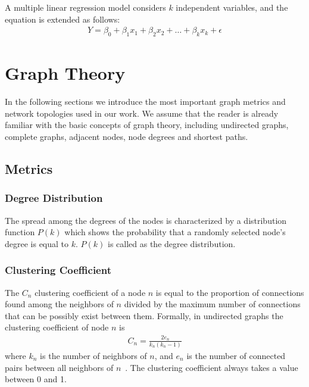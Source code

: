 A multiple linear regression model considers $k$ independent variables, and the equation is extended as follows:
\begin{align}
	Y = \beta_0 + \beta_1x_1 + \beta_2x_2 + \dots + \beta_kx_k + \epsilon
\end{align}

\section{Graph Theory}

In the following sections we introduce the most important graph metrics and network topologies used in our work. We assume that the reader is already familiar with the basic concepts of graph theory, including undirected graphs, complete graphs, adjacent nodes,
node degrees and shortest paths.
\subsection{Metrics}

\subsubsection{Degree Distribution}

The spread among the degrees of the nodes is characterized by a distribution function $P(k)$ which shows the probability that a randomly selected node's degree is equal to $k$. $P(k)$ is called as the degree distribution.

\subsubsection{Clustering Coefficient}

The $C_n$ clustering coefficient of a node $n$ is equal to the proportion of connections found among the neighbors of $n$ divided by the maximum number of connections that can be possibly exist between them. Formally, in undirected graphs the clustering coefficient of node $n$ is 
\begin{align}
	C_n = \frac{2e_n}{k_n(k_n-1) }
\end{align}
where $k_n$ is the number of neighbors of $n$, and $e_n$ is the number of connected pairs between all neighbors of $n$~\cite{clustering_formula}. The clustering coefficient always takes a value between 0 and 1.


